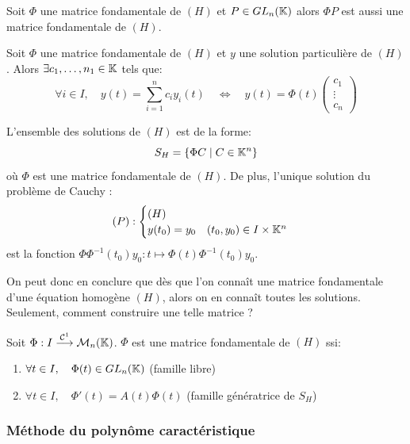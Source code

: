 \begin{remark} 
	Soit $\Phi$ une matrice fondamentale de $(H)$ et $P \in  GL_n(\mathbb{K})$ alors $\Phi P$ est aussi 
	une matrice fondamentale de $(H)$. 
\end{remark} 

Soit $\Phi$ une matrice fondamentale de $(H)$ et $y$ une solution particulière de $(H)$.
Alors $ \exists c_1, \dots, n_1 \in  \mathbb{K}$ tels que: 
	\[ \forall i \in  I, \quad y(t) = \sum_{i=1}^{n} c_i y_i(t) \quad \iff \quad y(t) = \Phi(t) 
		\begin{pmatrix}
			c_1 \\ 
			\vdots \\
			c_n 
		\end{pmatrix} \] 

\begin{proposition}
	L'ensemble des solutions de $(H)$ est de la forme: 
		\[ S_H = \{ \Phi C \; | \; C \in  \mathbb{K}^n \} \] 
	où $\Phi$ est une matrice fondamentale de $(H)$. De plus, l'unique solution 
	du problème de Cauchy :
		\[ (P) : \begin{cases}
				(H) \\ 
				y(t_0) = y_0 \quad (t_0, y_0) \in  I \times \mathbb{K}^n
			\end{cases} \]
	est la fonction $ \Phi \Phi^{-1} (t_0) y_0 : t \longmapsto \Phi(t) \Phi^{-1}(t_0) y_0$.  
\end{proposition} 

On peut donc en conclure que dès que l'on connaît une matrice fondamentale 
d'une équation homogène $(H)$, alors on en connaît toutes les solutions. 
Seulement, comment construire une telle matrice ? 

\begin{prop} 
	Soit $\Phi : I \overset{ \mathcal{C}^1}{\longrightarrow} \mathcal{M}_n(\mathbb{K})$. $\Phi$ est 
	une matrice fondamentale de $(H)$ ssi:
	\begin{enumerate} 
		\item $ \forall t \in  I, \quad \Phi(t) \in  GL_n(\mathbb{K}) $ (famille libre) 
		\item $ \forall t \in  I, \quad \Phi '(t) = A(t) \Phi(t) $ (famille génératrice de $S_H$)
	\end{enumerate} 
\end{prop} 

\subsubsection{Méthode du polynôme caractéristique} 

